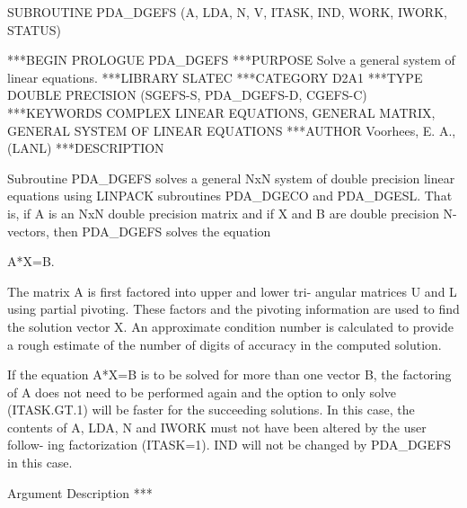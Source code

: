 \documentclass[11pt,twoside,nolof]{starlink}
\begin{document}


\begin{terminalv}
      SUBROUTINE PDA_DGEFS (A, LDA, N, V, ITASK, IND, WORK, IWORK, STATUS)


***BEGIN PROLOGUE  PDA_DGEFS
***PURPOSE  Solve a general system of linear equations.
***LIBRARY   SLATEC
***CATEGORY  D2A1
***TYPE      DOUBLE PRECISION (SGEFS-S, PDA_DGEFS-D, CGEFS-C)
***KEYWORDS  COMPLEX LINEAR EQUATIONS, GENERAL MATRIX,
             GENERAL SYSTEM OF LINEAR EQUATIONS
***AUTHOR  Voorhees, E. A., (LANL)
***DESCRIPTION

    Subroutine PDA_DGEFS solves a general NxN system of double
    precision linear equations using LINPACK subroutines PDA_DGECO
    and PDA_DGESL.  That is, if A is an NxN double precision matrix
    and if X and B are double precision N-vectors, then PDA_DGEFS
    solves the equation

                          A*X=B.

    The matrix A is first factored into upper and lower tri-
    angular matrices U and L using partial pivoting.  These
    factors and the pivoting information are used to find the
    solution vector X.  An approximate condition number is
    calculated to provide a rough estimate of the number of
    digits of accuracy in the computed solution.

    If the equation A*X=B is to be solved for more than one vector
    B, the factoring of A does not need to be performed again and
    the option to only solve (ITASK.GT.1) will be faster for
    the succeeding solutions.  In this case, the contents of A,
    LDA, N and IWORK must not have been altered by the user follow-
    ing factorization (ITASK=1).  IND will not be changed by PDA_DGEFS
    in this case.

  Argument Description ***


\end{terminalv}
\end{document}
